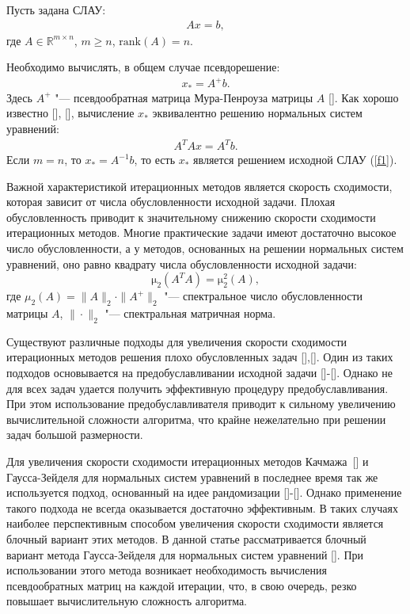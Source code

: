 Пусть задана СЛАУ:
\begin{eqnarray}
Ax=b, \label{f1}
\end{eqnarray}
где $A\in \mathbb{R}^{m\times n}$, $m\geq n$, $\mathrm{rank}(A)=n$.

Необходимо вычислять, в общем случае псевдорешение:
\begin{eqnarray}
x_{\ast}=A^{+}b. \label{f2}
\end{eqnarray}
Здесь $A^{+}$ "--- псевдообратная матрица Мура-Пенроуза матрицы $A$ [].
Как хорошо известно [], [], вычисление $x_{\ast}$ эквивалентно решению нормальных систем уравнений:
\begin{eqnarray}
A^{T}Ax=A^{T}b. \label{f3}
\end{eqnarray}
Если $m=n$, то $x_{\ast}=A^{-1}b$, то есть $x_{\ast}$ является решением исходной СЛАУ (\ref{f1}).

Важной характеристикой итерационных методов является скорость сходимости, которая зависит от числа обусловленности исходной задачи. Плохая обусловленность приводит к значительному снижению скорости сходимости итерационных методов. Многие практические задачи имеют достаточно высокое число обусловленности, а у методов, основанных на решении нормальных систем уравнений, оно равно квадрату числа обусловленности исходной задачи:
\[
\mathrm{\mu}_{2}(A^{T}A)= \mathrm{\mu}_{2}^{2}(A),
\]
где $\mu_{2}(A)=\|A\|_{2} \cdot \|A^{+}\|_{2}$
"--- спектральное число обусловленности матрицы $A$, $\|\cdot\|_{2}$ "--- спектральная матричная норма.

Существуют различные подходы для увеличения скорости сходимости итерационных методов решения плохо обусловленных задач [],[]. Один из таких подходов основывается на предобуславливании исходной задачи []-[]. Однако не для всех задач удается получить эффективную процедуру предобуславливания. При этом использование предобуславливателя приводит к сильному увеличению вычислительной сложности алгоритма, что крайне нежелательно при решении задач большой размерности.

Для увеличения скорости сходимости итерационных методов Качмажа~[] и Гаусса-Зейделя для нормальных систем уравнений в последнее время так же используется подход, основанный на идее рандомизации []-[]. Однако применение такого подхода не всегда оказывается достаточно эффективным. В таких случаях наиболее перспективным способом увеличения скорости сходимости является блочный вариант этих методов. В данной статье рассматривается блочный вариант метода Гаусса-Зейделя для нормальных систем уравнений []. При использовании этого метода возникает необходимость вычисления псевдообратных матриц на каждой итерации, что, в свою очередь, резко повышает вычислительную сложность алгоритма.

